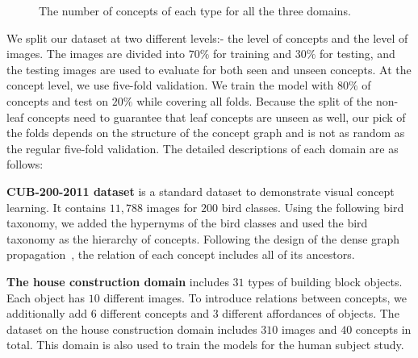 \begin{figure}[h]
\caption{The number of concepts of each type for all the three domains.}
\label{fig:concept_type}
\end{figure}

\begin{table}[t]
\caption{Statistics for the three domains. The number of train and test concepts of the CUB-200-2011 dataset comes from the average of five different splits, resulted in decimal numbers.}
\label{tab:all_stats}
\end{table}

We split our dataset at two different levels:- the level of concepts and the level of images. The images are divided into $70\%$ for training and $30\%$ for testing, and the testing images are used to evaluate for both seen and unseen concepts. At the concept level, we use five-fold validation. We train the model with $80\%$ of concepts and test on $20\%$ while covering all folds. Because the split of the non-leaf concepts need to guarantee that leaf concepts are unseen as well, our pick of the folds depends on the structure of the concept graph and is not as random as the regular five-fold validation.
The detailed descriptions of each domain are as follows:

\noindent\textbf{CUB-200-2011 dataset}\cite{WahCUB_200_2011} is a standard dataset to demonstrate visual concept learning.
It contains $11,788$ images for $200$ bird classes. Using the following  bird taxonomy\cite{Sullivan2009eBirdAC}, we added the hypernyms of the bird classes and used the bird taxonomy as the hierarchy of concepts.
Following the design of the dense graph propagation~\cite{kampffmeyer2019rethinking}, the relation of each concept includes all of its ancestors.

\noindent\textbf{The house construction domain} includes $31$ types of building block objects.
Each object has $10$ different images. 
To introduce relations between concepts, we additionally add $6$ different concepts and $3$ different affordances of objects.
The dataset on the house construction domain includes $310$ images and $40$ concepts in total.
This domain is also used to train the models for the human subject study.


